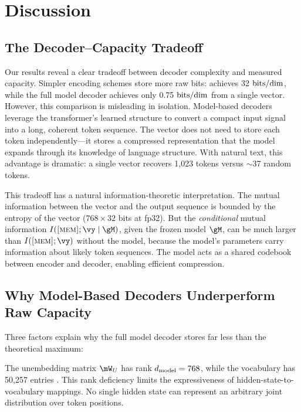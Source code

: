 \section{Discussion}
\label{sec:discussion}

\subsection{The Decoder--Capacity Tradeoff}

Our results reveal a clear tradeoff between decoder complexity and measured capacity. Simpler encoding schemes store more raw bits: \asciienc achieves 32 $\mathrm{bits/dim}$, while the full model decoder achieves only 0.75 $\mathrm{bits/dim}$ from a single vector. However, this comparison is misleading in isolation. Model-based decoders leverage the transformer's learned structure to convert a compact input signal into a long, coherent token sequence. The \memvec vector does not need to store each token independently---it stores a compressed representation that the model expands through its knowledge of language structure. With natural text, this advantage is dramatic: a single vector recovers 1,023 tokens versus $\sim$37 random tokens.

This tradeoff has a natural information-theoretic interpretation. The mutual information between the \memvec vector and the output sequence is bounded by the entropy of the vector ($768 \times 32$ bits at fp32). But the \emph{conditional} mutual information $I(\memvec; \vy \mid \gM)$, given the frozen model $\gM$, can be much larger than $I(\memvec; \vy)$ without the model, because the model's parameters carry information about likely token sequences. The model acts as a shared codebook between encoder and decoder, enabling efficient compression.

\subsection{Why Model-Based Decoders Underperform Raw Capacity}

Three factors explain why the full model decoder stores far less than the theoretical maximum:

 The unembedding matrix $\mW_U$ has rank $d_{\mathrm{model}} = 768$, while the vocabulary has 50,257 entries \citep{yang2018breaking}. This rank deficiency limits the expressiveness of hidden-state-to-vocabulary mappings. No single hidden state can represent an arbitrary joint distribution over token positions.

